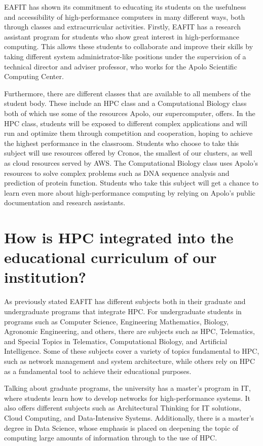 \documentclass[11pt,a4paper,twocolumn]{article}
\begin{document}
    EAFIT has shown its commitment to educating its students on the usefulness and accessibility of high-performance computers in many different ways, both through classes and extracurricular activities. Firstly, EAFIT has a research assistant program for students who show great interest in high-performance computing. This allows these students to collaborate and improve their skills by taking different system administrator-like positions under the supervision of a technical director and adviser professor, who works for the Apolo Scientific Computing Center.

    Furthermore, there are different classes that are available to all members of the student body. These include an HPC class and a Computational Biology class both of which use some of the resources Apolo, our supercomputer, offers. In the HPC class, students will be exposed to different complex applications and will run and optimize them through competition and cooperation, hoping to achieve the highest performance in the classroom. Students who choose to take this subject will use resources offered by Cronos, the smallest of our clusters, as well as cloud resources served by AWS. The Computational Biology class uses Apolo’s resources to solve complex problems such as DNA sequence analysis and prediction of protein function. Students who take this subject will get a chance to learn even more about high-performance computing by relying on Apolo's public documentation and research assistants.

    \section{How is HPC integrated into the educational curriculum of our institution?}

    As previously stated EAFIT has different subjects both in their graduate and undergraduate programs that integrate HPC. For undergraduate students in programs such as Computer Science, Engineering Mathematics, Biology, Agronomic Engineering, and others, there are subjects such as HPC, Telematics, and Special Topics in Telematics, Computational Biology, and Artificial Intelligence. Some of these subjects cover a variety of topics fundamental to HPC, such as network management and system architecture, while others rely on HPC as a fundamental tool to achieve their educational purposes.

    Talking about graduate programs, the university has a master's program in IT, where students learn how to develop networks for high-performance systems. It also offers different subjects such as Architectural Thinking for IT solutions, Cloud Computing, and Data-Intensive Systems. Additionally, there is a master’s degree in Data Science, whose emphasis is placed on deepening the topic of computing large amounts of information through to the use of HPC.
\end{document}
